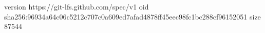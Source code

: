 version https://git-lfs.github.com/spec/v1
oid sha256:96934a64c06c5212c707c0a609ed7afad4878ff45eec98fc1bc288cf96152051
size 87544
